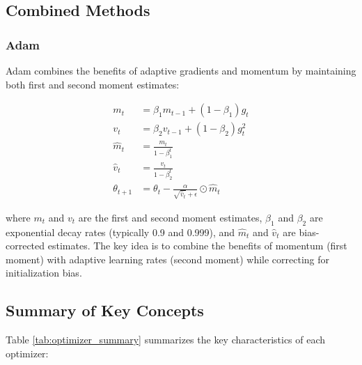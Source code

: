 \documentclass[12pt]{article}
\begin{document}
\subsection{Combined Methods}

\subsubsection{Adam}

Adam combines the benefits of adaptive gradients and momentum by maintaining both first and second moment estimates:

\begin{align}
m_t &= \beta_1 m_{t-1} + (1-\beta_1) g_t \\
v_t &= \beta_2 v_{t-1} + (1-\beta_2) g_t^2 \\
\hat{m}_t &= \frac{m_t}{1-\beta_1^t} \\
\hat{v}_t &= \frac{v_t}{1-\beta_2^t} \\
\theta_{t+1} &= \theta_t - \frac{\alpha}{\sqrt{\hat{v}_t} + \epsilon} \odot \hat{m}_t
\end{align}

where $m_t$ and $v_t$ are the first and second moment estimates, $\beta_1$ and $\beta_2$ are exponential decay rates (typically 0.9 and 0.999), and $\hat{m}_t$ and $\hat{v}_t$ are bias-corrected estimates. The key idea is to combine the benefits of momentum (first moment) with adaptive learning rates (second moment) while correcting for initialization bias.

\subsection{Summary of Key Concepts}

Table \ref{tab:optimizer_summary} summarizes the key characteristics of each optimizer:
\end{document}
